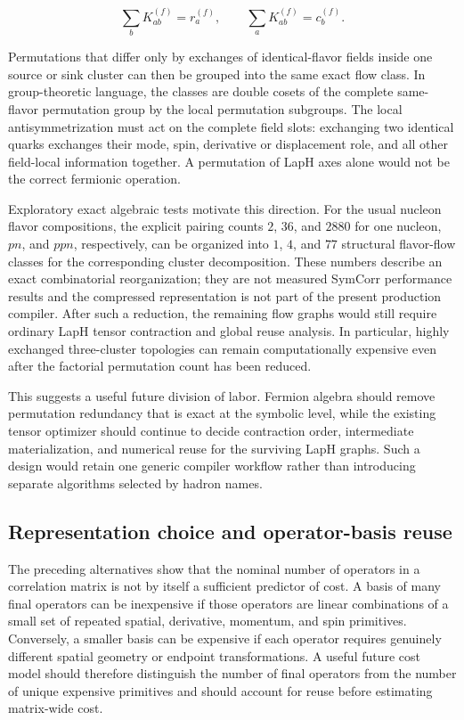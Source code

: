 \begin{equation}
\sum_b K_{ab}^{(f)}=r_a^{(f)},
\qquad
\sum_a K_{ab}^{(f)}=c_b^{(f)}.
\label{eq:future_flavor_flow_constraints}
\end{equation}

Permutations that differ only by exchanges of identical-flavor fields inside
one source or sink cluster can then be grouped into the same exact flow class.
In group-theoretic language, the classes are double cosets of the complete
same-flavor permutation group by the local permutation subgroups. The local
antisymmetrization must act on the complete field slots: exchanging two
identical quarks exchanges their mode, spin, derivative or displacement role,
and all other field-local information together. A permutation of LapH axes
alone would not be the correct fermionic operation.

Exploratory exact algebraic tests motivate this direction. For the usual
nucleon flavor compositions, the explicit pairing counts \(2\), \(36\), and
\(2880\) for one nucleon, \(pn\), and \(ppn\), respectively, can be organized
into \(1\), \(4\), and \(77\) structural flavor-flow classes for the corresponding
cluster decomposition. These numbers describe an exact combinatorial
reorganization; they are not measured SymCorr performance results and the
compressed representation is not part of the present production compiler.
After such a reduction, the remaining flow graphs would still require ordinary
LapH tensor contraction and global reuse analysis. In particular, highly
exchanged three-cluster topologies can remain computationally expensive even
after the factorial permutation count has been reduced.

This suggests a useful future division of labor. Fermion algebra should remove
permutation redundancy that is exact at the symbolic level, while the existing
tensor optimizer should continue to decide contraction order, intermediate
materialization, and numerical reuse for the surviving LapH graphs. Such a
design would retain one generic compiler workflow rather than introducing
separate algorithms selected by hadron names.

\subsection{Representation choice and operator-basis reuse}
\label{subsec:future_representation_choice}

The preceding alternatives show that the nominal number of operators in a
correlation matrix is not by itself a sufficient predictor of cost. A basis of
many final operators can be inexpensive if those operators are linear
combinations of a small set of repeated spatial, derivative, momentum, and spin
primitives. Conversely, a smaller basis can be expensive if each operator
requires genuinely different spatial geometry or endpoint transformations. A
useful future cost model should therefore distinguish the number of final
operators from the number of unique expensive primitives and should account for
reuse before estimating matrix-wide cost.

